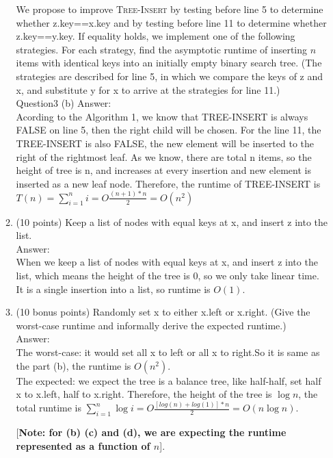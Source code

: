 \documentclass[12pt]{article}
\begin{document}
\begin{enumerate}
\begin{enumerate}
	
		We propose to improve \textsc{Tree-Insert} by testing before line 5 to determine whether z.key==x.key and by testing before line 11 to determine whether z.key==y.key. If equality holds, we implement one of the following strategies. For each strategy, find the asymptotic runtime of inserting $n$ items with identical keys into an initially empty binary search tree. (The strategies are described for line 5, in which we compare the keys of z and x, and substitute y for x to arrive at the strategies for line 11.)
         \\ {\color{blue}Question3 (b) Answer:	
    		\\Acording to the Algorithm 1, we know that TREE-INSERT is always FALSE on line 5, then the right child will be chosen. For the line 11, the TREE-INSERT is also FALSE, the new element will be inserted to the right of the rightmost leaf. As we know, there are total n items, so the height of tree is n, and increases at every insertion and new element is inserted as a new leaf node. Therefore, the runtime of TREE-INSERT is $T(n) = \sum_{i=1}^{n}i = O\frac{(n+1)*n}{2} = O(n^2)$
    		}
		\item (10 points) Keep a list of nodes with equal keys at x, and insert z into the list.
	 \\ {\color{blue}Answer:	\\When we keep a list of nodes with equal keys at x, and insert z into the list, which means the height of the tree is 0, so we only take linear time. It is a single insertion into a list, so runtime is $O (1)$.
	 }
		\item (10 bonus points) Randomly set x to either x.left or x.right. (Give the worst-case runtime and informally derive the expected runtime.)
	\\	 {\color{blue} Answer:
	\\The worst-case: it would set all x to left or all x to right.So it is same as the part (b), the runtime is $ O(n^2)$.
	\\The expected: we expect the tree is a balance tree, like half-half, set half x to x.left, half to x.right. Therefore, the height of the tree is $\log n$, the total runtime is $\sum_{i=1}^{n} \log i = O\frac{[log(n)+log(1)]*n}{2} = O (n\log n)$.
	}
		
		[\textbf{Note: for (b) (c) and (d), we are expecting the runtime represented as a function of $n$}].
	\end{enumerate}


\end{enumerate}
\end{document}
